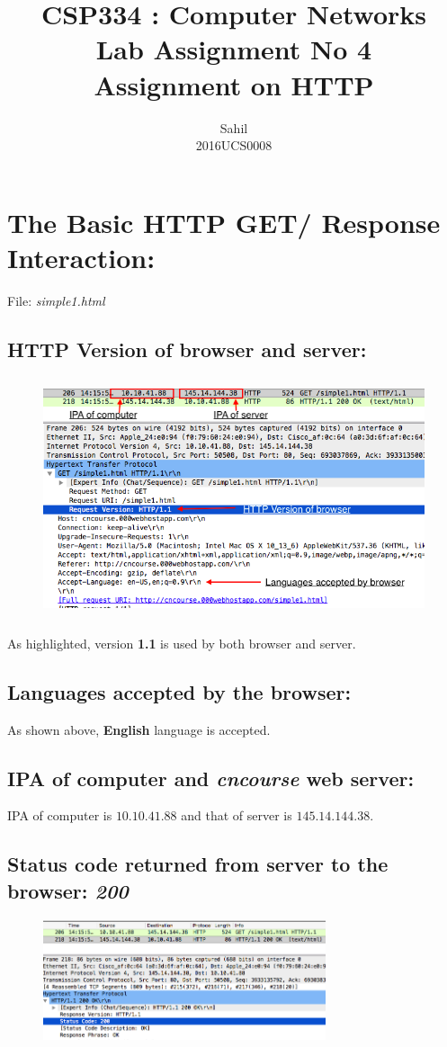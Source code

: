 \documentclass[]{report}
\title{\centering CSP334 : Computer Networks \\Lab Assignment No 4\\Assignment on HTTP}
\author{\LARGE Sahil\\2016UCS0008}
\begin{document}
 

\maketitle

\section{The Basic HTTP GET/ Response Interaction:}
File: \textit{simple1.html}
\subsection{HTTP Version of browser and server:}
\begin{figure}[H]
	\vspace{0pt}
	\includegraphics[height = 200pt, keepaspectratio]{Snapshots/q1/simple1/1_1.png}
\end{figure}
As highlighted, version \textbf{1.1} is used by both browser and server. 
\subsection{Languages accepted by the browser:}
As shown above, \textbf{English} language is accepted. 
\subsection{IPA of computer and \textit{cncourse} web server:}
IPA of computer is $10.10.41.88$ and that of server is $145.14.144.38$. 
\subsection{Status code returned from server to the browser: \textit{200}}
\begin{figure}[H]
	\vspace{0pt}
	\includegraphics[height = 100pt, keepaspectratio]{Snapshots/q1/simple1/1_4.png}
\end{figure}
\end{document}
